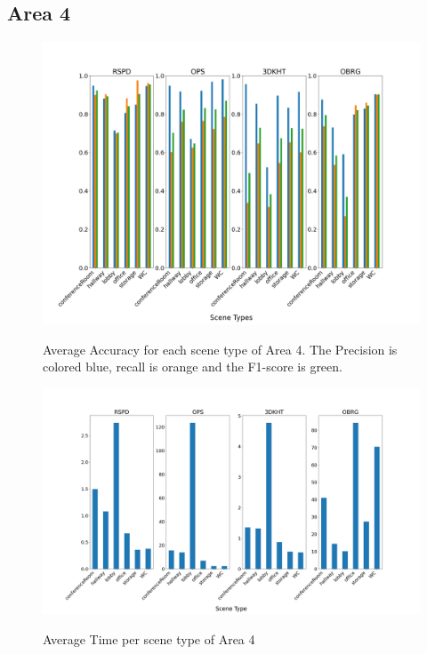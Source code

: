 \documentclass[main.tex]{subfiles}
\begin{document}
\subsection{Area 4}

\begin{figure}[H]
    \centering
    \includegraphics[width=15 cm]{images/area_4_acc.png}
    \label{fig:area4A}
    \caption[Accuracies Area 4]{Average Accuracy for each scene type of Area 4. The Precision
        is colored blue, recall is orange and the F1-score is green. }
\end{figure}

\begin{figure}[H]
    \centering
    \includegraphics[width=15 cm]{images/area_4_time.png}
    \label{fig:area4T}
    \caption[Times Area 4]{Average Time per scene type of Area 4}
\end{figure}
\end{document}
